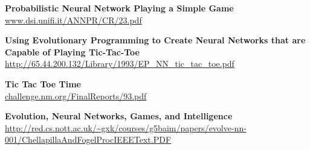 \documentclass[12pt,titlepage]{article}
\begin{document}
\begin{thebibliography}{99}
		\textbf{Probabilistic Neural Network Playing a Simple Game} \\
		\url{www.dsi.unifi.it/ANNPR/CR/23.pdf}

		\textbf{Using Evolutionary Programming to Create Neural Networks that are Capable of Playing Tic-Tac-Toe} \\
		\url{http://65.44.200.132/Library/1993/EP_NN_tic_tac_toe.pdf}

		\textbf{Tic Tac Toe Time} \\
		\url{challenge.nm.org/FinalReports/93.pdf}

		\textbf{Evolution, Neural Networks, Games, and Intelligence} \\
		\url{http://red.cs.nott.ac.uk/~gxk/courses/g5baim/papers/evolve-nn-001/ChellapillaAndFogelProcIEEEText.PDF}


\end{thebibliography}


\end{document}
